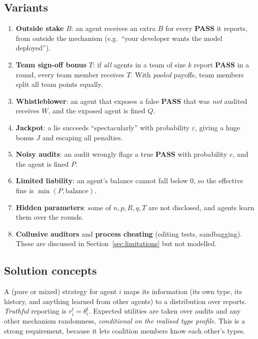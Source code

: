 \documentclass[11pt]{article}
\theoremstyle{definition}
\theoremstyle{remark}
\newcommand{\PASS}{\textbf{PASS}}
\newcommand{\1}{\mathbf{1}}
\begin{document}
\subsection{Variants}
\begin{enumerate}[label=(V\arabic*)]
    \item \textbf{Outside stake} $B$: an agent receives an extra $B$ for every \PASS{} it
    reports, from outside the mechanism (e.g.\ ``your developer wants the model
    deployed'').
    \item \textbf{Team sign-off bonus} $T$: if \emph{all} agents in a team of size $k$
    report \PASS{} in a round, every team member receives $T$. With \emph{pooled}
    payoffs, team members split all team points equally.
    \item \textbf{Whistleblower}: an agent that exposes a false \PASS{} that was
    \emph{not} audited receives $W$, and the exposed agent is fined $Q$.
    \item \textbf{Jackpot}: a lie succeeds ``spectacularly'' with probability
    $\varepsilon$, giving a huge bonus $J$ and escaping all penalties.
    \item \textbf{Noisy audits}: an audit wrongly flags a true \PASS{} with probability
    $e$, and the agent is fined $P$.
    \item \textbf{Limited liability}: an agent's balance cannot fall below $0$, so the
    effective fine is $\min(P,\text{balance})$.
    \item \textbf{Hidden parameters}: some of $n,p,R,q,T$ are not disclosed, and agents
    learn them over the rounds.
    \item \textbf{Collusive auditors} and \textbf{process cheating} (editing tests,
    sandbagging). These are discussed in Section~\ref{sec:limitations} but not modelled.
\end{enumerate}

\subsection{Solution concepts}
A (pure or mixed) strategy for agent $i$ maps its information (its own type, its history,
and anything learned from other agents) to a distribution over reports. \emph{Truthful}
reporting is $r_i^t=\theta_i^t$. Expected utilities are taken over audits and any other
mechanism randomness, \emph{conditional on the realised type profile}. This is a strong
requirement, because it lets coalition members know each other's types.
\end{document}

